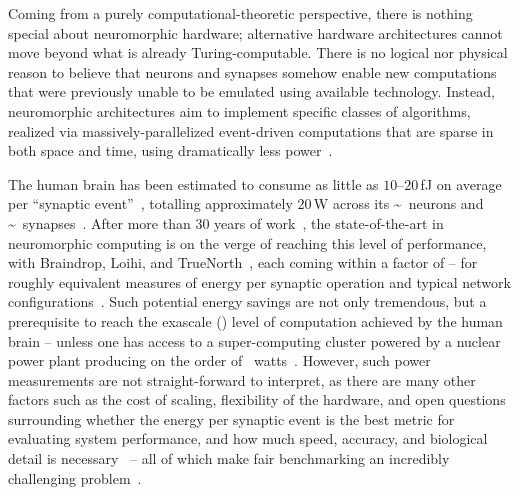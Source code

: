 Coming from a purely computational-theoretic perspective, there is nothing special about neuromorphic hardware; alternative hardware architectures cannot move beyond what is already Turing-computable.
There is no logical nor physical reason to believe that neurons and synapses somehow enable new computations that were previously unable to be emulated using available technology.
Instead, neuromorphic architectures aim to implement specific classes of algorithms, realized via massively-parallelized event-driven computations that are sparse in both space and time, using dramatically less power~\citep{tang2017sparse}.

The human brain has been estimated to consume as little as $10$--$20$\,fJ on average per ``synaptic event''~\citep{cassidy2014real, boahen2017neuromorph}, totalling approximately $20$\,W across its {\textasciitilde{}}~neurons and {\textasciitilde{}}~synapses~\citep{koch2014}.
After more than $30$ years of work~\citep{cassidy2013design}, the state-of-the-art in neuromorphic computing is on the verge of reaching this level of performance, with Braindrop, Loihi, and TrueNorth~\citep{merolla2014million}, each coming within a factor of -- for roughly equivalent measures of energy per synaptic operation and typical network configurations~\citep{braindrop2019}.
Such potential energy savings are not only tremendous, but a prerequisite to reach the exascale () level of computation achieved by the human brain -- unless one has access to a super-computing cluster powered by a nuclear power plant producing on the order of ~watts~\citep{furber2012build, neurogrid2014}.
However, such power measurements are not straight-forward to interpret, as there are many other factors such as the cost of scaling, flexibility of the hardware, and open questions surrounding whether the energy per synaptic event is the best metric for evaluating system performance, and how much speed, accuracy, and biological detail is necessary~\citep{eliasmith2013build} -- all of which make fair benchmarking an incredibly challenging problem~\citep{stewart2015closed}.

